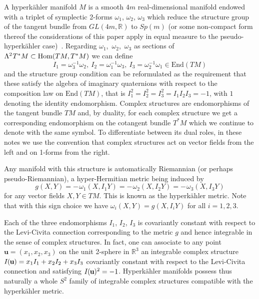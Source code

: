 \documentclass[11pt]{amsart}
\theoremstyle{remark}
\theoremstyle{remark}
\theoremstyle{definition}
\theoremstyle{definition}
\theoremstyle{definition}
\newcommand{\IU}{I\nhp(\nhp\mathbf{u}\hspace{-0.2pt})} %
\newcommand{\0}{{\scriptstyle 0'}} %
\newcommand{\1}{{\scriptstyle 1'}}
\newcommand{\pt}{\hspace{1pt}} %
\newcommand{\hp}{\hspace{0.5pt}} %
\newcommand{\nhp}{\hspace{-0.5pt}} %
\begin{document}
A hyperk\"ahler manifold $M$ is a smooth $4m$ real-dimensional manifold endowed with a triplet of symplectic 2-forms $\omega_1$, $\omega_2$, $\omega_3$ which reduce the structure group of the tangent bundle from $GL(4m,\mathbb{R})$ to $Sp(m)$ (or some non-compact form thereof{\,\textemdash\,}the considerations of this paper apply in equal measure to the pseudo-hyperk\"ahler case)~\cite{MR887284}. Regarding \mbox{$\omega_1$, $\omega_2$, $\omega_3$} as sections of \mbox{$\Lambda^2 \hp T^*M \subset \text{Hom}(TM,T^*M)$} we can define
\begin{equation} \label{i=oo}
I_1 = \omega_3^{-1} \omega_2, \ I_2 = \omega_1^{-1} \omega_3, \ I_3 = \omega_2^{-1} \omega_1 \in \text{End}(TM)
\end{equation}
and the structure group condition can be reformulated as the requirement that these satisfy the algebra of imaginary quaternions with respect to the composition law on $\text{End}(TM)$, that is \mbox{$I_1^2 = I_2^2 = I_3^2 = I_1I_2I_3 = - 1$}, with $1$ denoting the identity endomorphism. Complex structures are endomorphisms of the tangent bundle $TM$ and, by duality, for each complex structure we get a corresponding endomorphism on the cotangent bundle $T^*M$ which we continue to denote with the same symbol. To differentiate between its dual roles, in these notes we use the convention that complex structures act on vector fields from the left and on 1-forms from the right.

Any manifold with this structure is automatically Riemannian (or perhaps pseudo-Rie\-mannian), a hyper-Hermitian metric being induced by
\begin{equation}
g(X,Y) = - \pt \omega_1(X,I_1Y) = - \pt \omega_2(X,I_2Y) =  - \pt \omega_3(X,I_3Y)
\end{equation}
for any vector fields \mbox{$X,Y \in TM$}. This is known as the hyperk\"ahler metric.  Note that with this sign choice we have \mbox{$\omega_i(X,Y) = g(X,I_iY)$} for all $i=1,2,3$. 

Each of the three endomorphisms $I_1$, $I_2$, $I_3$ is covariantly constant with respect to the Levi-Civita connection corresponding to the metric $g$ and hence integrable in the sense of complex structures. In fact, one can associate to any point $\mathbf{u} = (x_1,x_2,x_3)$ on the unit 2-sphere in $\mathbb{R}^3$ an integrable complex structure \mbox{$\IU = x_1 I_1 + x_2 I_2 + x_3 I_3$} covariantly constant with respect to the Levi-Civita connection and satisfying $\IU^2 = - 1$. Hyperk\"ahler manifolds possess thus naturally a whole $S^2$ family of integrable complex structures compatible with the hyperk\"ahler metric. 
\end{document}
